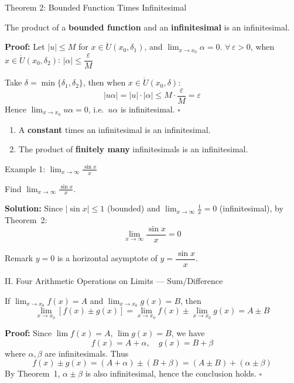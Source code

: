 \documentclass[UTF8,10pt]{beamer}
\begin{document}
\begin{frame}{Theorem 2: Bounded Function Times Infinitesimal}
\begin{theorem}
The product of a \textbf{bounded function} and an \textbf{infinitesimal} is an infinitesimal.
\end{theorem}
\pause
\textbf{Proof:} Let $|u| \le M$ for $x \in \mathring{U}(x_0, \delta_1)$, and $\displaystyle \lim_{x\to x_0}\alpha = 0$.
\pause
$\forall\,\varepsilon > 0$, when $x \in \mathring{U}(x_0, \delta_2)$: $|\alpha| \le \dfrac{\varepsilon}{M}$
\pause
\vspace{0.3em}

Take $\delta = \min\{\delta_1, \delta_2\}$, then when $x \in \mathring{U}(x_0, \delta)$:
\[
|u\alpha| = |u|\cdot|\alpha| \le M \cdot \frac{\varepsilon}{M} = \varepsilon
\]
\pause
Hence $\displaystyle \lim_{x\to x_0} u\alpha = 0$, i.e.\ $u\alpha$ is infinitesimal. \hfill $\square$
\pause
\vspace{0.3em}
\begin{corollary}
\begin{enumerate}
    \item A \textbf{constant} times an infinitesimal is an infinitesimal.
    \item The product of \textbf{finitely many} infinitesimals is an infinitesimal.
\end{enumerate}
\end{corollary}
\end{frame}

\begin{frame}{Example 1: $\displaystyle \lim_{x\to\infty}\frac{\sin x}{x}$}
\begin{example}
Find $\displaystyle \lim_{x\to\infty}\frac{\sin x}{x}$.
\end{example}
\pause
\textbf{Solution:} Since $|\sin x| \le 1$ (bounded) and $\displaystyle \lim_{x\to\infty}\frac{1}{x}=0$ (infinitesimal),
\pause
by Theorem~2:
\[
\boxed{\lim_{x\to\infty}\frac{\sin x}{x} = 0}
\]
\pause
\vspace{0.3em}
\begin{block}{Remark}
$y = 0$ is a horizontal asymptote of $y = \dfrac{\sin x}{x}$.
\end{block}
\end{frame}

\begin{frame}{II. Four Arithmetic Operations on Limits --- Sum/Difference}
\begin{theorem}
If $\displaystyle \lim_{x\to x_0} f(x) = A$ and $\displaystyle \lim_{x\to x_0} g(x) = B$, then
\[
\lim_{x\to x_0} [f(x) \pm g(x)] = \lim_{x\to x_0} f(x) \pm \lim_{x\to x_0} g(x) = A \pm B
\]
\end{theorem}
\pause
\textbf{Proof:} Since $\lim f(x) = A$, $\lim g(x) = B$, we have
\[
f(x) = A + \alpha, \quad g(x) = B + \beta
\]
where $\alpha, \beta$ are infinitesimals.
\pause
Thus
\[
f(x) \pm g(x) = (A+\alpha) \pm (B+\beta) = (A\pm B) + (\alpha \pm \beta)
\]
\pause
By Theorem~1, $\alpha \pm \beta$ is also infinitesimal, hence the conclusion holds. \hfill $\square$
\end{frame}
\end{document}
